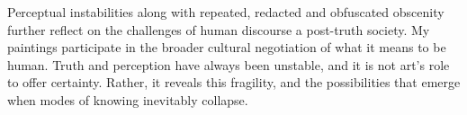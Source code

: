 \documentclass[12pt]{article}
\begin{document}
Perceptual instabilities along with repeated, redacted and obfuscated
obscenity further reflect on the challenges of human discourse a
post-truth society. My paintings participate in the broader cultural
negotiation of what it means to be human. Truth and perception have
always been unstable, and it is not art's role to offer
certainty. Rather, it reveals this fragility, and the possibilities
that emerge when modes of knowing inevitably collapse.

\newpage


\end{document}

